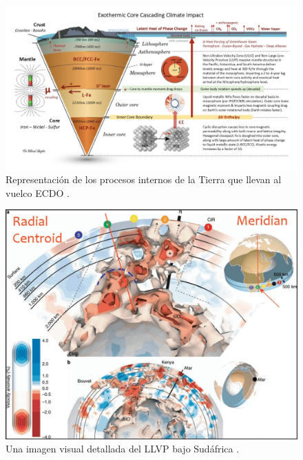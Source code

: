 \documentclass[10pt,twocolumn,letterpaper]{article}
\begin{document}
\begin{figure}[t]
\begin{center}
\includegraphics[width=1\textwidth]{layers.jpg}
\end{center}
   \caption{Representación de los procesos internos de la Tierra que llevan al vuelco ECDO \cite{129}.}
\label{fig:11}
\end{figure}

\begin{figure}[t]
\begin{center}
   \includegraphics[width=1\linewidth]{llvp.jpg}
\end{center}
   \caption{Una imagen visual detallada del LLVP bajo Sudáfrica \cite{28}.}
\label{fig:12}
\label{fig:onecol}
\end{figure}
\end{document}
